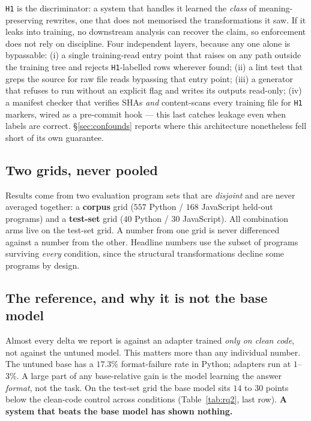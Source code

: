 \documentclass[sigconf,review,anonymous]{acmart}
\newcommand{\cond}[1]{\texttt{#1}}
\begin{document}
\cond{H1} is the discriminator: a system that handles it learned the \emph{class} of
meaning-preserving rewrites, one that does not memorised the transformations it saw. If it leaks
into training, no downstream analysis can recover the claim, so enforcement does not rely on
discipline. Four independent layers, because any one alone is bypassable: (i) a single
training-read entry point that raises on any path outside the training tree and rejects
\cond{H1}-labelled rows wherever found; (ii) a lint test that greps the source for raw file
reads bypassing that entry point; (iii) a generator that refuses to run without an explicit
flag and writes its outputs read-only; (iv) a manifest checker that verifies SHAs \emph{and}
content-scans every training file for \cond{H1} markers, wired as a pre-commit hook --- this
last catches leakage even when labels are correct. \S\ref{sec:confounds} reports where this
architecture nonetheless fell short of its own guarantee.

\subsection{Two grids, never pooled}

Results come from two evaluation program sets that are \emph{disjoint} and are never averaged
together: a \textbf{corpus} grid ($557$ Python / $168$ JavaScript held-out programs) and a
\textbf{test-set} grid ($40$ Python / $30$ JavaScript). All combination arms live on the
test-set grid. A number from one grid is never differenced against a number from the other.
Headline numbers use the subset of programs surviving \emph{every} condition, since the
structural transformations decline some programs by design.

\subsection{The reference, and why it is not the base model}
\label{sec:reference}

Almost every delta we report is against an adapter trained \emph{only on clean code}, not
against the untuned model. This matters more than any individual number. The untuned base has a
$17.3\%$ format-failure rate in Python; adapters run at $1$--$3\%$. A large part of any
base-relative gain is the model learning the answer \emph{format}, not the task. On the test-set
grid the base model sits $14$ to $30$ points below the clean-code control across conditions
(Table~\ref{tab:rq2}, last row). \textbf{A system that beats the base model has shown nothing.}
\end{document}

